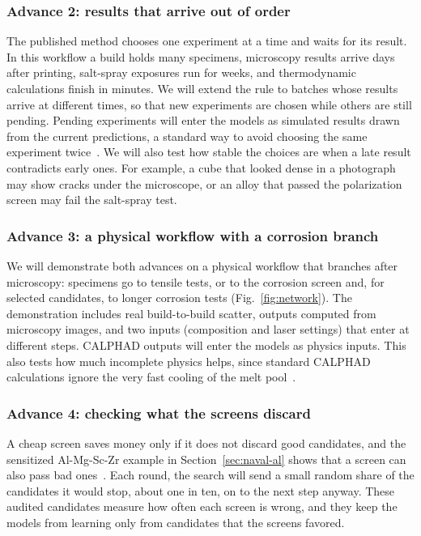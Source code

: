 \documentclass[12pt,letterpaper]{article}
\begin{document}
\subsubsection{Advance 2: results that arrive out of order}
The published method chooses one experiment at a time and waits for its
result. In this workflow a build holds many specimens, microscopy results
arrive days after printing, salt-spray exposures run for weeks, and
thermodynamic calculations finish in minutes. We will extend the rule to
batches whose results arrive at different times, so that new experiments are
chosen while others are still pending. Pending experiments will enter the
models as simulated results drawn from the current predictions, a standard way
to avoid choosing the same experiment twice~\cite{snoek2012}. We will also
test how stable the choices are when a late result contradicts early ones.
For example, a cube that looked dense in a photograph may show cracks under
the microscope, or an alloy that passed the polarization screen may fail the
salt-spray test.

\subsubsection{Advance 3: a physical workflow with a corrosion branch}
We will demonstrate both advances on a physical workflow that branches after
microscopy: specimens go to tensile tests, or to the corrosion screen and, for
selected candidates, to longer corrosion tests (Fig.~\ref{fig:network}). The
demonstration includes real build-to-build scatter, outputs computed from
microscopy images, and two inputs (composition and laser settings) that enter
at different steps. CALPHAD outputs will enter the models as physics inputs.
This also tests how much incomplete physics helps, since standard CALPHAD
calculations ignore the very fast cooling of the melt pool~\cite{debroy2018}.

\subsubsection{Advance 4: checking what the screens discard}
A cheap screen saves money only if it does not discard good candidates, and
the sensitized Al-Mg-Sc-Zr example in Section~\ref{sec:naval-al} shows that a
screen can also pass bad ones~\cite{cabreracorrea2023}. Each
round, the search will send a small random share of the candidates it would
stop, about one in ten, on to the next step anyway. These audited candidates
measure how often each screen is wrong, and they keep the models from learning
only from candidates that the screens favored.
\end{document}
